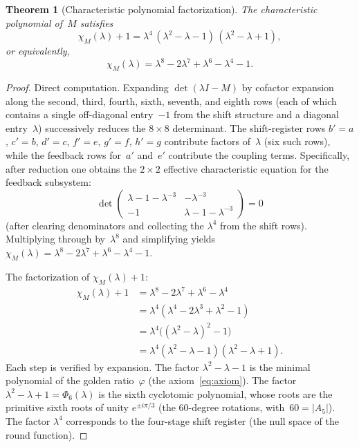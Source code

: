 \documentclass[12pt, a4paper]{article}
\theoremstyle{plain}
\newtheorem{theorem}{Theorem}[section]
\theoremstyle{definition}
\newcommand{\vp}{\varphi}
\newcommand{\charpoly}{\chi_M}
\begin{document}
\begin{theorem}[Characteristic polynomial factorization]\label{thm:charpoly}
The characteristic polynomial of~$M$ satisfies
\begin{equation}\label{eq:charpoly-factor}
  \charpoly(\lambda) + 1
  = \lambda^{4}\,(\lambda^{2}-\lambda-1)\,(\lambda^{2}-\lambda+1),
\end{equation}
or equivalently,
\begin{equation}
  \charpoly(\lambda)
  = \lambda^{8}-2\lambda^{7}+\lambda^{6}-\lambda^{4}-1.
\end{equation}
\end{theorem}

\begin{proof}
Direct computation.
Expanding $\det(\lambda I - M)$ by cofactor expansion along the
second, third, fourth, sixth, seventh, and eighth rows (each of
which contains a single off-diagonal entry~$-1$ from the shift
structure and a diagonal entry~$\lambda$) successively reduces
the $8\times 8$ determinant.
The shift-register rows $b'=a$, $c'=b$, $d'=c$, $f'=e$, $g'=f$,
$h'=g$ contribute factors of~$\lambda$ (six such rows), while
the feedback rows for~$a'$ and~$e'$ contribute the coupling
terms.
Specifically, after reduction one obtains the $2\times 2$
effective characteristic equation for the feedback subsystem:
\[
  \det\begin{pmatrix}
    \lambda - 1 - \lambda^{-3} & -\lambda^{-3}\\
    -1 & \lambda - 1 - \lambda^{-3}
  \end{pmatrix}
  = 0
\]
(after clearing denominators and collecting the $\lambda^{4}$
from the shift rows).
Multiplying through by~$\lambda^{8}$ and simplifying yields
$\charpoly(\lambda)=\lambda^{8}-2\lambda^{7}+\lambda^{6}-\lambda^{4}-1$.

The factorization of $\charpoly(\lambda)+1$:
\begin{align*}
  \charpoly(\lambda)+1
  &= \lambda^{8}-2\lambda^{7}+\lambda^{6}-\lambda^{4}\\
  &= \lambda^{4}(\lambda^{4}-2\lambda^{3}+\lambda^{2}-1)\\
  &= \lambda^{4}\bigl((\lambda^{2}-\lambda)^{2}-1\bigr)\\
  &= \lambda^{4}(\lambda^{2}-\lambda-1)(\lambda^{2}-\lambda+1).
\end{align*}
Each step is verified by expansion.
The factor $\lambda^{2}-\lambda-1$ is the minimal polynomial of
the golden ratio~$\vp$ (the axiom~\eqref{eq:axiom}).
The factor $\lambda^{2}-\lambda+1=\Phi_{6}(\lambda)$ is the sixth
cyclotomic polynomial, whose roots are the primitive sixth roots
of unity $e^{\pm i\pi/3}$ (the $60$-degree rotations,
with~$60=|A_{5}|$).
The factor $\lambda^{4}$ corresponds to the four-stage shift
register (the null space of the round function).
\end{proof}
\end{document}

